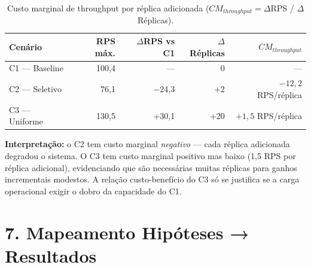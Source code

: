 \documentclass[a4paper,11pt]{article}
\begin{document}
\vspace{1em}

\begin{table}[h]
\centering
\caption{Custo marginal de throughput por réplica adicionada ($CM_{throughput} = \Delta$RPS / $\Delta$Réplicas).}
\begin{tabular}{lrrrr}
\toprule
\textbf{Cenário} & \textbf{RPS máx.} & \textbf{$\Delta$RPS vs C1} & \textbf{$\Delta$Réplicas} & \textbf{$CM_{throughput}$} \\
\midrule
C1 — Baseline & 100{,}4 & — & 0 & — \\
\rowcolor{breakred!10}
C2 — Seletivo & 76{,}1  & $-$24{,}3 & +2  & $-12{,}2$ RPS/réplica \\
\rowcolor{okgreen!10}
C3 — Uniforme & 130{,}5 & $+$30{,}1 & +20 & $+1{,}5$ RPS/réplica \\
\bottomrule
\end{tabular}
\end{table}

\textbf{Interpretação:} o C2 tem custo marginal \emph{negativo} — cada réplica adicionada degradou o sistema. O C3 tem custo marginal positivo mas baixo (1{,}5 RPS por réplica adicional), evidenciando que são necessárias muitas réplicas para ganhos incrementais modestos. A relação custo-benefício do C3 só se justifica se a carga operacional exigir o dobro da capacidade do C1.

\section{7. Mapeamento Hipóteses → Resultados}
\end{document}
